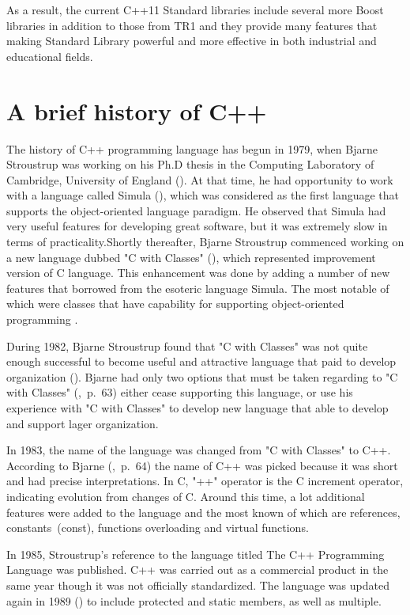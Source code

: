 \documentclass[11pt]{report}
\begin{document}
As a result, the current C++11 Standard libraries include several more Boost libraries in addition to those from TR1 and they provide many features that making Standard Library powerful and more effective in both industrial and educational fields.

\section{A brief history of C++}
\label{sec: History of C++}
The history of C++ programming language has begun in 1979, when Bjarne Stroustrup was working on his Ph.D thesis in the Computing Laboratory of Cambridge, University of England (\cite{StroustrupHistory}). At that time, he had opportunity to work with a language called Simula (\cite{Stroustrup:2012:Cpp11}), which was considered as the first language that supports the object-oriented language paradigm. He observed that Simula had very useful features for developing great software, but it was extremely slow in terms of practicality.Shortly thereafter, Bjarne Stroustrup commenced working on a new language dubbed "C with Classes" (\cite{StroustrupHistory}), which represented improvement version of C language. This enhancement was done by adding a number of new features that borrowed from the esoteric language Simula. The most notable of which were classes that have capability for supporting object-oriented programming . 

During 1982, Bjarne Stroustrup found that "C with Classes" was not quite enough successful to become useful and attractive language that paid to develop organization (\cite{StroustrupHistory}). Bjarne had only two options that must be taken regarding to "C with Classes" (\cite{Stroustrup:1994:DesignEvolution},~p.~63) either cease supporting this language, or use his experience with "C with Classes" to develop new language that able to develop and support lager organization.

In 1983, the name of the language was changed from "C with Classes" to C++. According to Bjarne (\cite{Stroustrup:1994:DesignEvolution},~p.~64) the name of C++ was picked because it was short and had precise interpretations. In C, "++" operator is the C increment operator, indicating evolution from changes of C.  Around this time, a lot additional features were added to the language and the most known of which are references, constants~(const), functions overloading and virtual functions.

In 1985, Stroustrup's reference to the language titled The C++ Programming Language was published. C++ was carried out as a commercial product in the same year though it was not officially standardized. The language was updated again in 1989 (\cite{CplusplusHistoryofCpp}) to include protected and static members, as well as multiple.
\end{document}
